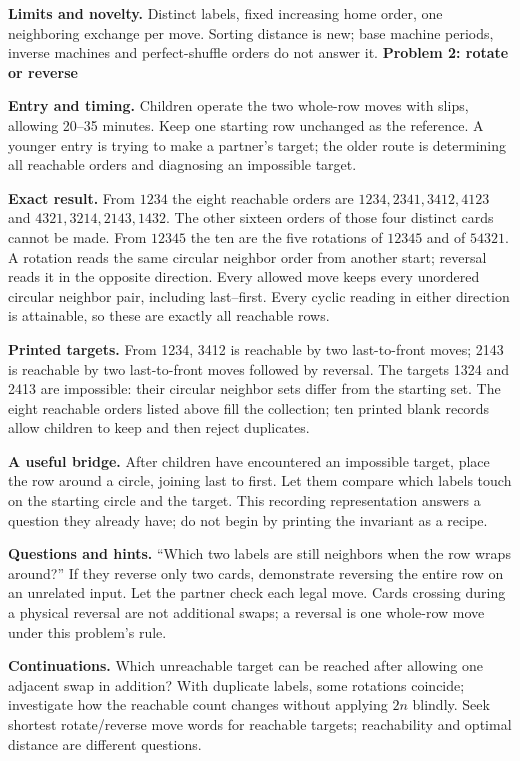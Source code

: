 \documentclass[11pt]{article}
\newcommand\lead[1]{\textbf{#1}\par}
\begin{document}
\textbf{Limits and novelty.} Distinct labels, fixed increasing home order, one neighboring exchange per move. Sorting distance is new; base machine periods, inverse machines and perfect-shuffle orders do not answer it.
\newpage
\lead{Problem 2: rotate or reverse}
\textbf{Entry and timing.} Children operate the two whole-row moves with slips, allowing 20--35 minutes. Keep one starting row unchanged as the reference. A younger entry is trying to make a partner's target; the older route is determining all reachable orders and diagnosing an impossible target.

\textbf{Exact result.} From $1234$ the eight reachable orders are $1234,2341,3412,4123$ and $4321,3214,2143,1432$. The other sixteen orders of those four distinct cards cannot be made. From $12345$ the ten are the five rotations of $12345$ and of $54321$. A rotation reads the same circular neighbor order from another start; reversal reads it in the opposite direction. Every allowed move keeps every unordered circular neighbor pair, including last--first. Every cyclic reading in either direction is attainable, so these are exactly all reachable rows.

\textbf{Printed targets.} From 1234, 3412 is reachable by two last-to-front moves; 2143 is reachable by two last-to-front moves followed by reversal. The targets 1324 and 2413 are impossible: their circular neighbor sets differ from the starting set. The eight reachable orders listed above fill the collection; ten printed blank records allow children to keep and then reject duplicates.

\textbf{A useful bridge.} After children have encountered an impossible target, place the row around a circle, joining last to first. Let them compare which labels touch on the starting circle and the target. This recording representation answers a question they already have; do not begin by printing the invariant as a recipe.

\textbf{Questions and hints.} ``Which two labels are still neighbors when the row wraps around?'' If they reverse only two cards, demonstrate reversing the entire row on an unrelated input. Let the partner check each legal move. Cards crossing during a physical reversal are not additional swaps; a reversal is one whole-row move under this problem's rule.

\textbf{Continuations.} Which unreachable target can be reached after allowing one adjacent swap in addition? With duplicate labels, some rotations coincide; investigate how the reachable count changes without applying $2 n$ blindly. Seek shortest rotate/reverse move words for reachable targets; reachability and optimal distance are different questions.
\end{document}
